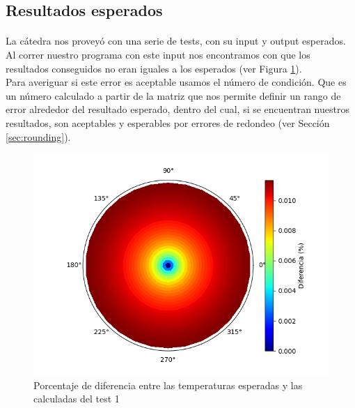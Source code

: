 \documentclass[12pt]{article}
\begin{document}
\subsection{Resultados esperados}
\label{sec:expected}

\paragraph{} La cátedra nos proveyó con una serie de tests, con su input y output esperados. Al correr nuestro programa con este input nos encontramos con que los resultados conseguidos no eran iguales a los esperados (ver Figura \ref{fig:expected.diffs}). \\
Para averiguar si este error es aceptable usamos el número de condición. Que es un número calculado a partir de la matriz que nos permite definir un rango de error alrededor del resultado esperado, dentro del cual, si se encuentran nuestros resultados, son aceptables y esperables por errores de redondeo (ver Sección \ref{sec:rounding}).


\begin{figure}[H]
\centering
\includegraphics[scale=0.5]{test1.1.0.temperature}
\caption{Porcentaje de diferencia entre las temperaturas esperadas y las calculadas del test 1}
\label{fig:expected.diffs}
\end{figure}
\end{document}
